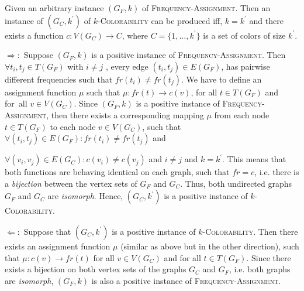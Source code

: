 Given an arbitrary instance $(G_{F},k)$ of \textsc{Frequency-Assignment}.
Then an instance of $(G_{C},k^{\prime })$ of $k$\textsc{-Colorability} can
be produced iff, $k=k^{\prime }$ and there exists a function $%
c:V(G_{C})\rightarrow C$, where $C=\{1,\ldots ,k^{\prime }\}$ is a set of
colors of size $k^{\prime }$.

$\Rightarrow :$ Suppose $(G_{F},k)$ is a positive instance of \textsc{%
Frequency-Assignment}. Then $\forall t_{i},t_{j}\in T(G_{F})$ with $i\neq j$%
, every edge $(t_{i},t_{j})\in E(G_{F})$, has pairwise different frequencies
such that $fr(t_{i})\neq fr(t_{j})$. We have to define an assignment
function $\mu $ such that $\mu :fr(t)\rightarrow c(v)$, for all $t\in
T(G_{F})$ and for\ all $v\in V(G_{C})$. Since $(G_{F},k)$ is a positive
instance of \textsc{Frequency-Assignment}, then there exists a corresponding
mapping $\mu $ from each node $t\in T(G_{F})$ to each node $v\in V(G_{C})$,
such that $\forall (t_{i},t_{j})\in E(G_{F}):fr(t_{i})\neq fr(t_{j})$ and 

$\forall (v_{i},v_{j})\in E(G_{C}):c(v_{i})\neq c(v_{j})$ and $i\neq j$ and $%
k=k^{\prime }$. This means that both functions are behaving identical on
each graph, such that $fr=c$, i.e. there is a \textit{bijection} between the
vertex sets of $G_{F}$ and $G_{C}$. Thus, both undirected graphs $G_{F}$ and 
$G_{C}$ are \textit{isomorph}. Hence, $(G_{C},k^{\prime })$ is a positive
instance of $k$\textsc{-Colorability}$.$

$\Leftarrow :$ Suppose that $(G_{C},k^{\prime })$ is a positive instance of $%
k$\textsc{-Colorability}. Then there exists an assignment function $\mu $
(similar as above but in the other direction), such that $\mu
:c(v)\rightarrow fr(t)$ for all $v\in V(G_{C})$ and for all $t\in T(G_{F})$.
Since there exists a bijection on both vertex sets of the graphs $G_{C}$ and 
$G_{F}$, i.e. both graphs are \textit{isomorph}, $(G_{F},k)$ is also a
positive instance of \textsc{Frequency-Assignment}.

\bigskip 
